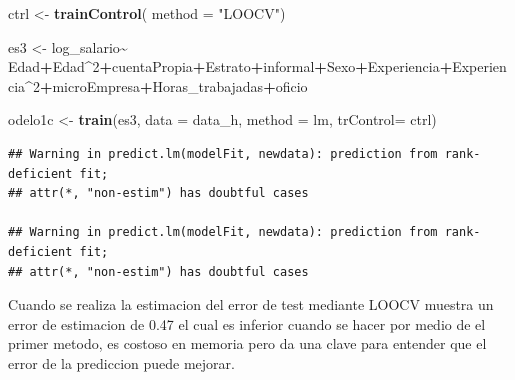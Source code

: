 \documentclass[
]{article}
\newenvironment{Shaded}{\begin{snugshade}}{\end{snugshade}}
\newcommand{\AttributeTok}[1]{\textcolor[rgb]{0.13,0.29,0.53}{#1}}
\newcommand{\DecValTok}[1]{\textcolor[rgb]{0.00,0.00,0.81}{#1}}
\newcommand{\FunctionTok}[1]{\textcolor[rgb]{0.13,0.29,0.53}{\textbf{#1}}}
\newcommand{\NormalTok}[1]{#1}
\newcommand{\OtherTok}[1]{\textcolor[rgb]{0.56,0.35,0.01}{#1}}
\newcommand{\SpecialCharTok}[1]{\textcolor[rgb]{0.81,0.36,0.00}{\textbf{#1}}}
\newcommand{\StringTok}[1]{\textcolor[rgb]{0.31,0.60,0.02}{#1}}
\begin{document}
\begin{Shaded}
\begin{Highlighting}[]
\NormalTok{ctrl }\OtherTok{\textless{}{-}} \FunctionTok{trainControl}\NormalTok{(}
  \AttributeTok{method =} \StringTok{"LOOCV"}\NormalTok{)}

\NormalTok{es3 }\OtherTok{\textless{}{-}}\NormalTok{ log\_salario}\SpecialCharTok{\textasciitilde{}}\NormalTok{ Edad}\SpecialCharTok{+}\NormalTok{Edad}\SpecialCharTok{\^{}}\DecValTok{2}\SpecialCharTok{+}\NormalTok{cuentaPropia}\SpecialCharTok{+}\NormalTok{Estrato}\SpecialCharTok{+}\NormalTok{informal}\SpecialCharTok{+}\NormalTok{Sexo}\SpecialCharTok{+}\NormalTok{Experiencia}\SpecialCharTok{+}\NormalTok{Experiencia}\SpecialCharTok{\^{}}\DecValTok{2}\SpecialCharTok{+}\NormalTok{microEmpresa}\SpecialCharTok{+}\NormalTok{Horas\_trabajadas}\SpecialCharTok{+}\NormalTok{oficio}

\NormalTok{odelo1c }\OtherTok{\textless{}{-}} \FunctionTok{train}\NormalTok{(es3,}
                  \AttributeTok{data =}\NormalTok{ data\_h,}
                  \AttributeTok{method =} \StringTok{\textquotesingle{}lm\textquotesingle{}}\NormalTok{, }
                  \AttributeTok{trControl=}\NormalTok{ ctrl)}
\end{Highlighting}
\end{Shaded}

\begin{verbatim}
## Warning in predict.lm(modelFit, newdata): prediction from rank-deficient fit;
## attr(*, "non-estim") has doubtful cases

## Warning in predict.lm(modelFit, newdata): prediction from rank-deficient fit;
## attr(*, "non-estim") has doubtful cases
\end{verbatim}

Cuando se realiza la estimacion del error de test mediante LOOCV muestra
un error de estimacion de 0.47 el cual es inferior cuando se hacer por
medio de el primer metodo, es costoso en memoria pero da una clave para
entender que el error de la prediccion puede mejorar.
\end{document}
